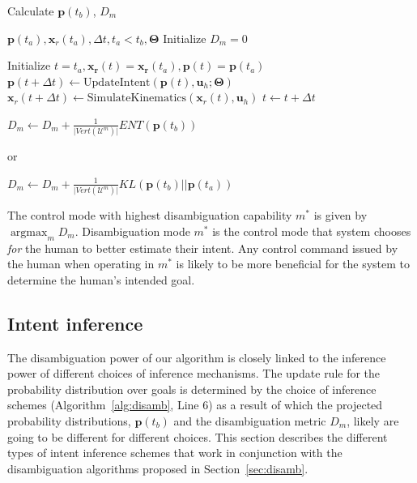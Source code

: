 \documentclass[conference]{IEEEtran}
\DeclareMathOperator*{\argmax}{argmax}
\begin{document}
\begin{algorithm}[t]
	\caption{Calculate $\boldsymbol{p}(t_b)$, $D_m$}
	\label{alg:disamb}
	\begin{algorithmic}[1]
		\REQUIRE $\boldsymbol{p}(t_a), \boldsymbol{x}_r(t_a), \Delta t, t_a < t_b, \boldsymbol{\Theta}$
		\STATE Initialize $D_m = 0$
		
		\STATE Initialize $t = t_a, \boldsymbol{x_r}(t) = \boldsymbol{x_r}(t_a), \boldsymbol{p}(t) = \boldsymbol{p}(t_a)$
		\STATE $\boldsymbol{p}(t + \Delta t) \leftarrow \text{UpdateIntent}(\boldsymbol{p}(t), \boldsymbol{u}_h; \boldsymbol{\Theta})$
		\STATE $\boldsymbol{x}_r(t + \Delta t) \leftarrow \text{SimulateKinematics}(\boldsymbol{x}_r(t), \boldsymbol{u}_h)$
		\STATE $t \leftarrow t + \Delta t$
		\ENDWHILE
		
		\STATE $D_m \leftarrow D_m + \frac{1}{\vert Vert(\mathcal{U}^m) \vert} ENT(\boldsymbol{p}(t_b)) $
		
		or
		
		\STATE $D_m \leftarrow D_m + \frac{1}{\vert Vert(\mathcal{U}^m) \vert} KL(\boldsymbol{p}(t_b) \vert\vert \boldsymbol{p}(t_a)) $
		
		\ENDFOR
		\ENDFOR
	\end{algorithmic}
\end{algorithm}
The control mode with highest disambiguation capability $m^*$ is given by $\argmax_m D_m$. Disambiguation mode $m^*$ is the control mode that system chooses \textit{for} the human to better estimate their intent. Any control command issued by the human when operating in $m^*$ is likely to be more beneficial for the system to determine the human's intended goal. 

\subsection{Intent inference}\label{ssec:inference}
  The disambiguation power of our algorithm is closely linked to the inference power of different choices of inference mechanisms. The update rule for the probability distribution over goals is determined by the choice of inference schemes (Algorithm~\ref{alg:disamb}, Line 6) as a result of which the projected probability distributions, $\boldsymbol{p}(t_b)$ and the disambiguation metric $D_m$, likely are going to be different for different choices. This section describes the different types of intent inference schemes that work in conjunction with the disambiguation algorithms proposed in Section~\ref{sec:disamb}.
\end{document}
